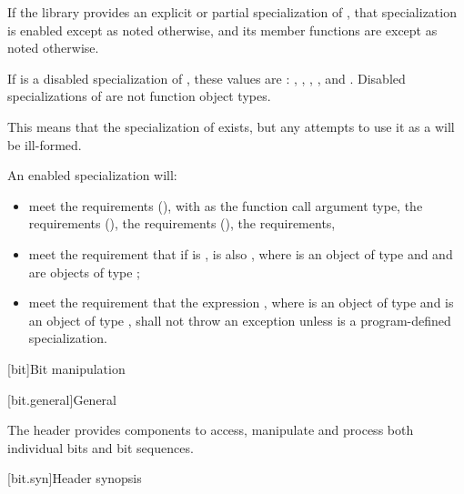 \pnum
If the library provides an explicit or partial specialization of ,
that specialization is enabled except as noted otherwise,
and its member functions are  except as noted otherwise.

\pnum
If  is a disabled specialization of ,
these values are :
,
,
,
, and
.
Disabled specializations of 
are not function object types.
\begin{note}
This means that the specialization of  exists, but
any attempts to use it as a  will be ill-formed.
\end{note}

\pnum
An enabled specialization  will:
\begin{itemize}
\item meet the  requirements (),
with  as the function
call argument type, the  requirements (),
the  requirements (),
the  requirements,
\item meet the requirement that if  is ,  is
also , where  is an object of type  and  and 
are objects of type ;
\item meet the requirement that the expression , where 
is an object of type  and  is an object of type
, shall not throw an exception unless  is a
program-defined specialization.
\end{itemize}

[bit]{Bit manipulation}

[bit.general]{General}

\pnum
The header  provides components to access,
manipulate and process both individual bits and bit sequences.

[bit.syn]{Header  synopsis}

